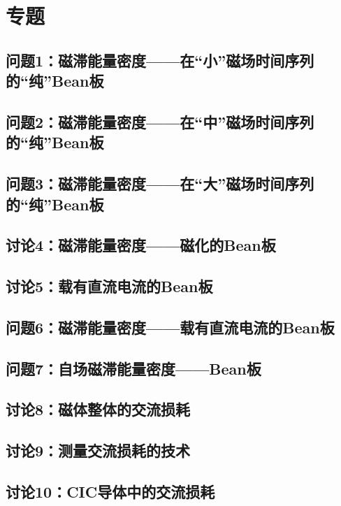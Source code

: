 \section{专题}
\subsection{问题1：磁滞能量密度——在“小”磁场时间序列的“纯”Bean板}

\newpage
\subsection{问题2：磁滞能量密度——在“中”磁场时间序列的“纯”Bean板}

\newpage
\subsection{问题3：磁滞能量密度——在“大”磁场时间序列的“纯”Bean板}

\newpage
\subsection{讨论4：磁滞能量密度——磁化的Bean板}

\newpage
\subsection{讨论5：载有直流电流的Bean板}

\newpage
\subsection{问题6：磁滞能量密度——载有直流电流的Bean板}

\newpage
\subsection{问题7：自场磁滞能量密度——Bean板}

\newpage
\subsection{讨论8：磁体整体的交流损耗}

\newpage
\subsection{讨论9：测量交流损耗的技术}

\newpage
\subsection{讨论10：CIC导体中的交流损耗}

